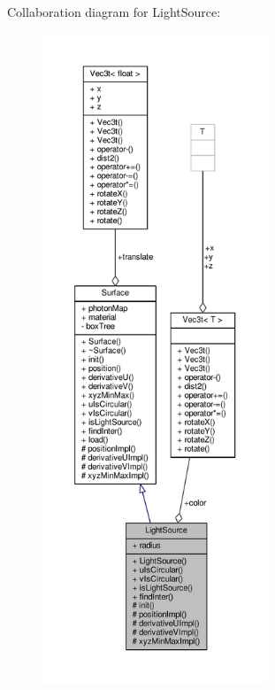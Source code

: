 Collaboration diagram for Light\+Source\+:
\nopagebreak
\begin{figure}[H]
\begin{center}
\leavevmode
\includegraphics[height=550pt]{classLightSource__coll__graph}
\end{center}
\end{figure}
